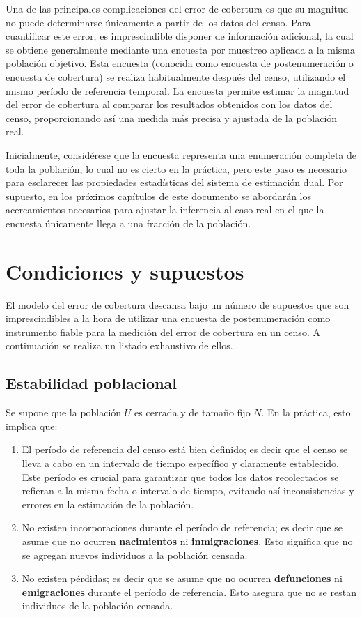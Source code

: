 \documentclass[
  12pt,
]{book}
\begin{document}
Una de las principales complicaciones del error de cobertura es que su magnitud no puede determinarse únicamente a partir de los datos del censo. Para cuantificar este error, es imprescindible disponer de información adicional, la cual se obtiene generalmente mediante una encuesta por muestreo aplicada a la misma población objetivo. Esta encuesta (conocida como encuesta de postenumeración o encuesta de cobertura) se realiza habitualmente después del censo, utilizando el mismo período de referencia temporal. La encuesta permite estimar la magnitud del error de cobertura al comparar los resultados obtenidos con los datos del censo, proporcionando así una medida más precisa y ajustada de la población real.

Inicialmente, considérese que la encuesta representa una enumeración completa de toda la población, lo cual no es cierto en la práctica, pero este paso es necesario para esclarecer las propiedades estadísticas del sistema de estimación dual. Por supuesto, en los próximos capítulos de este documento se abordarán los acercamientos necesarios para ajustar la inferencia al caso real en el que la encuesta únicamente llega a una fracción de la población.

\section{Condiciones y supuestos}\label{condiciones-y-supuestos}

El modelo del error de cobertura descansa bajo un número de supuestos que son imprescindibles a la hora de utilizar una encuesta de postenumeración como instrumento fiable para la medición del error de cobertura en un censo. A continuación se realiza un listado exhaustivo de ellos.

\subsection{Estabilidad poblacional}\label{estabilidad-poblacional}

Se supone que la población \(U\) es cerrada y de tamaño fijo \(N\). En la práctica, esto implica que:

\begin{enumerate}
\def\labelenumi{\arabic{enumi}.}
\item
  El período de referencia del censo está bien definido; es decir que el censo se lleva a cabo en un intervalo de tiempo específico y claramente establecido. Este período es crucial para garantizar que todos los datos recolectados se refieran a la misma fecha o intervalo de tiempo, evitando así inconsistencias y errores en la estimación de la población.
\item
  No existen incorporaciones durante el período de referencia; es decir que se asume que no ocurren \textbf{nacimientos} ni \textbf{inmigraciones}. Esto significa que no se agregan nuevos individuos a la población censada.
\item
  No existen pérdidas; es decir que se asume que no ocurren \textbf{defunciones} ni \textbf{emigraciones} durante el período de referencia. Esto asegura que no se restan individuos de la población censada.
\end{enumerate}
\end{document}
